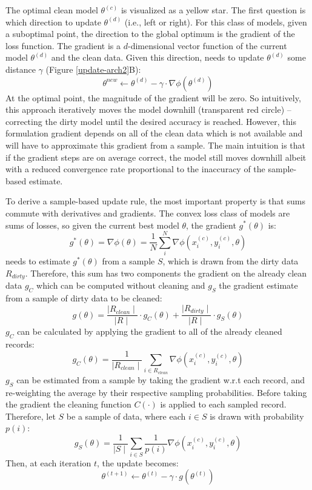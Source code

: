 The optimal clean model $\theta^{(c)}$ is visualized as a yellow star.
The first question is which direction to update $\theta^{(d)}$ (i.e., left or right).
For this class of models, given a suboptimal point, the direction to 
the global optimum is the gradient of the loss function.
The gradient is a $d$-dimensional vector function of the current model $\theta^{(d)}$ and the clean data.
Given this direction, \sys needs to update $\theta^{(d)}$ some distance $\gamma$ (Figure \ref{update-arch2}B):
\[
\theta^{new} \leftarrow \theta^{(d)} - \gamma \cdot \nabla\phi(\theta^{(d)})
\]
At the optimal point, the magnitude of the gradient will be zero.
So intuitively, this approach iteratively moves the model downhill (transparent red circle) -- correcting the dirty model until the desired accuracy is reached.
However, this formulation gradient depends on all of the clean data which is not available and \sys will have to approximate this gradient from a sample.
The main intuition is that if the gradient steps are on average correct, the model still moves downhill albeit with a reduced convergence rate proportional to the inaccuracy of the sample-based estimate.

To derive a sample-based update rule, the most important property is that sums commute with derivatives and gradients.
The convex loss class of models are sums of losses, so given the current best model $\theta$, the gradient $g^*(\theta)$ is:
\[
g^*(\theta) = \nabla\phi(\theta) = \frac{1}{N} \sum_i^N \nabla\phi(x_i^{(c)},y_i^{(c)},\theta)
\]
\sys needs to estimate $g^*(\theta)$ from a sample $S$, which is drawn from the dirty data $R_{dirty}$.
 Therefore, this sum has two components the gradient on the already clean data $g_C$ which can be computed without cleaning and $g_S$ the gradient estimate from a sample of dirty data to be cleaned:
\[
g(\theta) = \frac{\mid R_{clean} \mid}{\mid R \mid} \cdot g_C(\theta) + \frac{\mid R_{dirty} \mid}{\mid R \mid} \cdot g_S(\theta)
\]
$g_C$ can be calculated by applying the gradient to all of the already cleaned records:
\[
g_C(\theta) = \frac{1}{\mid R_{clean}\mid}\sum_{i \in R_{clean}}\nabla\phi(x_i^{(c)},y_i^{(c)},\theta)
\]
$g_S$ can be estimated from a sample by taking the gradient w.r.t each record, and re-weighting the average by their respective sampling probabilities.
Before taking the gradient the cleaning function $C(\cdot)$ is applied to each sampled record.
Therefore, let $S$ be a sample of data, where each $i \in S$ is drawn with probability $p(i)$:
\[
g_{S}(\theta) = \frac{1}{\mid S \mid} \sum_{i \in S}\frac{1}{p(i)}\nabla\phi(x_i^{(c)},y_i^{(c)},\theta)
\]
Then, at each iteration $t$, the update becomes:
\[
\theta^{(t+1)} \leftarrow \theta^{(t)} - \gamma \cdot g(\theta^{(t)})
\]

